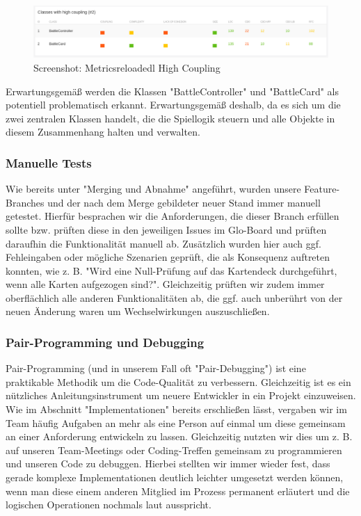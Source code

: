 \begin{figure}
\includegraphics[width=1\textwidth]{../img/sq/metricsreloaded3.PNG}
\caption{Screenshot: Metricsreloadedl High Coupling}
\label{fig:Screenshot Metricsreloaded High Coupling}
\end{figure}
Erwartungsgemäß werden die Klassen "BattleController" und "BattleCard" als potentiell problematisch erkannt. Erwartungsgemäß deshalb, da es sich um die zwei zentralen Klassen handelt, die die Spiellogik steuern und alle Objekte in diesem Zusammenhang halten und verwalten. 

\subsubsection{Manuelle Tests}
Wie bereits unter "Merging und Abnahme" angeführt, wurden unsere Feature-Branches und der nach dem Merge gebildeter neuer Stand immer manuell getestet. Hierfür besprachen wir die Anforderungen, die dieser Branch erfüllen sollte bzw. prüften diese in den jeweiligen Issues im Glo-Board und prüften daraufhin die Funktionalität manuell ab. Zusätzlich wurden hier auch ggf. Fehleingaben oder mögliche Szenarien geprüft, die als Konsequenz auftreten konnten, wie z. B. "Wird eine Null-Prüfung auf das Kartendeck durchgeführt, wenn alle Karten aufgezogen sind?". Gleichzeitig prüften wir zudem immer oberflächlich alle anderen Funktionalitäten ab, die ggf. auch unberührt von der neuen Änderung waren um Wechselwirkungen auszuschließen. 

\subsubsection{Pair-Programming und Debugging}
Pair-Programming (und in unserem Fall oft "Pair-Debugging") ist eine praktikable Methodik \cite{Pairprogramming} um die Code-Qualität zu verbessern. Gleichzeitig ist es ein nützliches Anleitungsinstrument um neuere Entwickler in ein Projekt einzuweisen.
Wie im Abschnitt "Implementationen" bereits erschließen lässt, vergaben wir im Team häufig Aufgaben an mehr als eine Person auf einmal um diese gemeinsam an einer Anforderung entwickeln zu lassen. Gleichzeitig nutzten wir dies um z. B. auf unseren Team-Meetings oder Coding-Treffen gemeinsam zu programmieren und unseren Code zu debuggen. Hierbei stellten wir immer wieder fest, dass gerade komplexe Implementationen deutlich leichter umgesetzt werden können, wenn man diese einem anderen Mitglied im Prozess permanent erläutert und die logischen Operationen nochmals laut ausspricht. 


